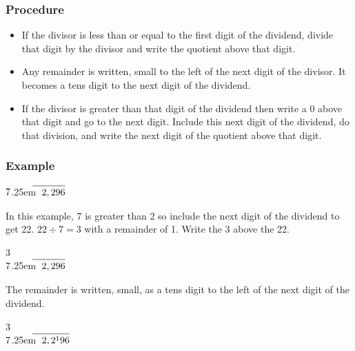\documentclass{article}
\newcommand\mylongdiv[2]{%
$\strut#1$\kern.25em\smash{\raise.3ex\hbox{$\big)$}}$\mkern-8mu
        \overline{\quad\strut#2}$}
\begin{document}
\begin{enumerate}
\newpage

\subsubsection{Procedure}

\begin{itemize}
\item If the divisor is less than or equal to the first digit of the dividend, divide that digit by the divisor and write the quotient above that digit.\\

\item Any remainder is written, small to the left of the next digit of the divisor. It becomes a tens digit to the next digit of the dividend.\\

\item If the divisor is greater than that digit of the dividend then write a 0 above that digit and go to the next digit. Include this next digit of the dividend, do that division, and write the next digit of the quotient above that digit.\\
\end{itemize}

\newpage

\subsubsection{Example}

\begin{center}
\mylongdiv{7}{2,296}\\
\end{center}

In this example, 7 is greater than 2 so include the next digit of the dividend to get 22. $22 \div 7 = 3$ with a remainder of 1. Write the 3 above the 22.
\begin{center}
\hspace{3.5ex}3\\
\mylongdiv{7}{2,296}\\
\end{center}

The remainder is written, small, as a tens digit to the left of the next digit of the dividend.
\begin{center}
\hspace{3ex}3\\
\mylongdiv{7}{2,2{^1}96}\\
\end{center}


\end{enumerate}
\end{document}
